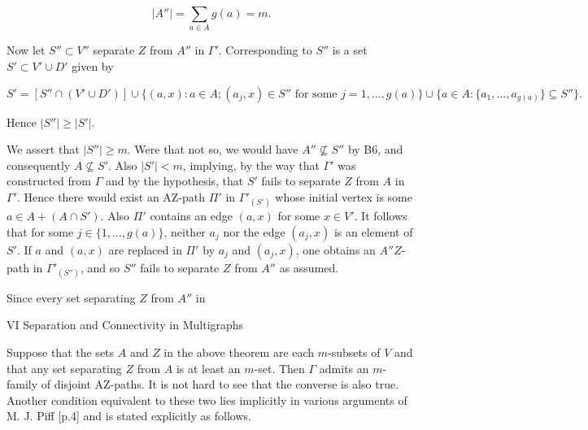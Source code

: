 $$|A''| = \sum_{a \in A} g(a) = m.$$

Now let $S'' \subset V''$ separate $Z$ from $A''$ in $\Gamma'$. Corresponding to $S''$ is a set $S' \subset V' \cup D'$ given by

$$S' = [S'' \cap (V' \cup D')] \cup \{(a, x): a \in A; (a_j, x) \in S'' \text{ for some } j = 1, \ldots, g(a)\} \cup \{a \in A: \{a_1, \ldots, a_{g(a)}\} \subseteq S''\}.$$

Hence $|S''| \geq |S'|$.

We assert that $|S''| \geq m$. Were that not so, we would have $A'' \not\subseteq S''$ by B6, and consequently $A \not\subseteq S'$. Also $|S'| < m$, implying, by the way that $\Gamma'$ was constructed from $\Gamma$ and by the hypothesis, that $S'$ fails to separate $Z$ from $A$ in $\Gamma'$. Hence there would exist an AZ-path $\Pi'$ in $\Gamma'_{(S')}$ whose initial vertex is some $a \in A + (A \cap S')$. Also $\Pi'$ contains an edge $(a, x)$ for some $x \in V'$. It follows that for some $j \in \{1, \ldots, g(a)\}$, neither $a_j$ nor the edge $(a_j, x)$ is an element of $S'$. If $a$ and $(a, x)$ are replaced in $\Pi'$ by $a_j$ and $(a_j, x)$, one obtains an $A''Z$-path in $\Gamma'_{(S'')}$, and so $S''$ fails to separate $Z$ from $A''$ as assumed.

Since every set separating $Z$ from $A''$ in

VI Separation and Connectivity in Multigraphs

Suppose that the sets $A$ and $Z$ in the above theorem are each $m$-subsets of $V$ and that any set separating $Z$ from $A$ is at least an $m$-set. Then $\Gamma$ admits an $m$-family of disjoint AZ-paths. It is not hard to see that the converse is also true. Another condition equivalent to these two lies implicitly in various arguments of M. J. Piff [p.4] and is stated explicitly as follows.
